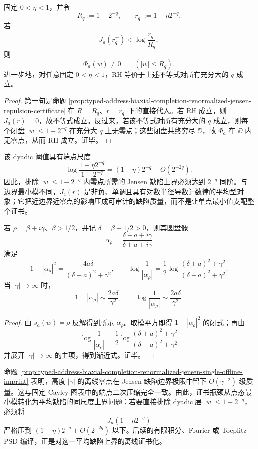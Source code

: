 \begin{corollary}\label{cor:typed-address-biaxial-completion-renormalized-jensen-dyadic-certificate}
固定 \(0<\eta<1\)，并令
\[
R_q:=1-2^{-q},
\qquad
r_q^+:=1-\eta2^{-q}.
\]
若
\[
J_a(r_q^+)
<
\log\frac{r_q^+}{R_q},
\]
则
\[
\Phi_a(w)\ne0\qquad(|w|\le R_q).
\]
进一步地，对任意固定 \(0<\eta<1\)，RH 等价于上述不等式对所有充分大的 \(q\) 成立。
\end{corollary}
\begin{proof}
第一句是命题 \ref{prop:typed-address-biaxial-completion-renormalized-jensen-repulsion-certificate} 在 \(R=R_q\)、\(r=r_q^+\) 下的直接代入。若 RH 成立，则 \(J_a(r)=0\)，故不等式成立。反过来，若该不等式对所有充分大的 \(q\) 成立，则每个闭盘 \(|w|\le1-2^{-q}\) 在充分大 \(q\) 上无零点；这些闭盘共终穷尽 \(\DD\)，故 \(\Phi_a\) 在 \(\DD\) 内无零点，从而 RH 成立。证毕。
\end{proof}

该 dyadic 阈值具有端点尺度
\[
\log\frac{1-\eta2^{-q}}{1-2^{-q}}
=(1-\eta)2^{-q}+O(2^{-2q}).
\]
因此，排除 \(|w|\le1-2^{-q}\) 内零点所需的 Jensen 缺陷上界必须达到 \(2^{-q}\) 同阶。与边界最小模不同，\(J_a(r)\) 是非负、单调且具有对数半径导数计数律的平均型对象；它把近边界近零点的影响压成可审计的缺陷质量，而不是让单点最小值支配整个证书。

\begin{proposition}\label{prop:typed-address-biaxial-completion-renormalized-jensen-single-offline-imprint}
若 \(\rho=\beta+i\gamma\)、\(\beta>1/2\)，并记 \(\delta=\beta-1/2>0\)，则其圆盘像
\[
\alpha_\rho
=
\frac{\delta-a+i\gamma}{\delta+a+i\gamma}
\]
满足
\[
1-|\alpha_\rho|^2
=
\frac{4a\delta}{(\delta+a)^2+\gamma^2},
\qquad
\log\frac1{|\alpha_\rho|}
=
\frac12\log
\frac{(\delta+a)^2+\gamma^2}{(\delta-a)^2+\gamma^2}.
\]
当 \(|\gamma|\to\infty\) 时，
\[
1-|\alpha_\rho|\sim \frac{2a\delta}{\gamma^2},
\qquad
\log\frac1{|\alpha_\rho|}
\sim
\frac{2a\delta}{\gamma^2}.
\]
\end{proposition}
\begin{proof}
由 \(s_a(w)=\rho\) 反解得到所示 \(\alpha_\rho\)。取模平方即得 \(1-|\alpha_\rho|^2\) 的闭式；再由
\[
\log\frac1{|\alpha_\rho|}
=
\frac12\log\frac{(\delta+a)^2+\gamma^2}{(\delta-a)^2+\gamma^2}
\]
并展开 \(|\gamma|\to\infty\) 的主项，得到渐近式。证毕。
\end{proof}

命题 \ref{prop:typed-address-biaxial-completion-renormalized-jensen-single-offline-imprint} 表明，高度 \(|\gamma|\) 的离线零点在 Jensen 缺陷边界极限中留下 \(O(\gamma^{-2})\) 级质量。这与固定 Cayley 图表中的端点二次压缩完全一致。由此，证书瓶颈从点态最小模转化为平均缺陷的同尺度上界问题：若要直接排除 dyadic 层 \(|w|\le1-2^{-q}\)，必须将
\[
J_a(1-\eta2^{-q})
\]
严格压到 \((1-\eta)2^{-q}+O(2^{-2q})\) 以下。后续的有限积分、Fourier 或 Toeplitz--PSD 编译，正是对这一平均缺陷上界的离线证书化。
